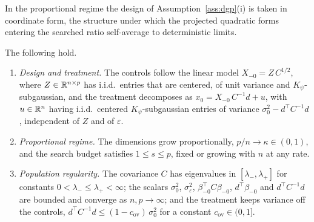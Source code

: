 
In the proportional regime the design of Assumption~\ref{ass:dgp}(i)
is taken in coordinate form, the structure under which the projected
quadratic forms entering the searched ratio self-average to deterministic
limits.

\begin{assumption}\label{ass:continuous}
The following hold.
\begin{enumerate}
\item[(i)] \emph{Design and treatment.} The controls follow the linear
model $X_{-0} = Z\, C^{1/2}$, where $Z \in \mathbb{R}^{n \times p}$ has i.i.d.\
entries that are centered, of unit variance and $K_\psi$-subgaussian, and
the treatment decomposes as $x_0 = X_{-0}\, C^{-1} d + u$, with
$u \in \mathbb{R}^n$ having i.i.d.\ centered $K_\psi$-subgaussian entries of
variance $\sigma_0^2 - d^\top C^{-1} d$, independent of $Z$ and of
$\varepsilon$.
\item[(ii)] \emph{Proportional regime.} The dimensions grow
proportionally, $p / n \to \kappa \in (0,1)$, and the search budget
satisfies $1 \le s \le p$, fixed or growing with $n$ at any rate.
\item[(iii)] \emph{Population regularity.} The covariance $C$ has
eigenvalues in $[\lambda_-, \lambda_+]$ for constants
$0 < \lambda_- \le \lambda_+ < \infty$; the scalars $\sigma_0^2$,
$\sigma_\varepsilon^2$, $\beta_{-0}^\top C \beta_{-0}$,
$d^\top \beta_{-0}$ and $d^\top C^{-1} d$ are bounded and converge as
$n, p \to \infty$; and the treatment keeps variance off the controls,
$d^\top C^{-1} d \le (1 - c_{\mathrm{ov}})\, \sigma_0^2$ for a constant
$c_{\mathrm{ov}} \in (0, 1]$.
\end{enumerate}
\end{assumption}

